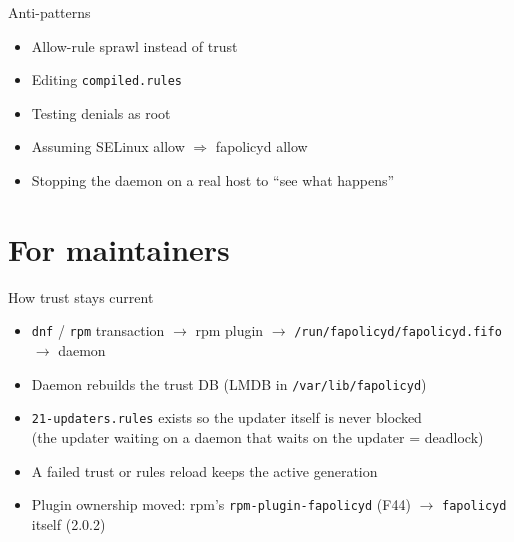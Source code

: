 \documentclass[aspectratio=169,11pt]{beamer}
\begin{document}
\begin{frame}{Anti-patterns}
  \begin{itemize}
    \item Allow-rule sprawl instead of trust
    \item Editing \texttt{compiled.rules}
    \item Testing denials as root
    \item Assuming SELinux allow $\Rightarrow$ fapolicyd allow
    \item Stopping the daemon on a real host to ``see what happens''
  \end{itemize}
\end{frame}

\section{For maintainers}

\begin{frame}{How trust stays current}
  \begin{itemize}
    \item \texttt{dnf} / \texttt{rpm} transaction $\rightarrow$ rpm plugin
          $\rightarrow$ \texttt{/run/fapolicyd/fapolicyd.fifo} $\rightarrow$ daemon
    \item Daemon rebuilds the trust DB (LMDB in \texttt{/var/lib/fapolicyd})
    \item \texttt{21-updaters.rules} exists so the updater itself is never blocked\\
          {\small (the updater waiting on a daemon that waits on the updater = deadlock)}
    \item A failed trust or rules reload keeps the active generation
    \item Plugin ownership moved: rpm's \texttt{rpm-plugin-fapolicyd} (F44)
          $\rightarrow$ \texttt{fapolicyd} itself (2.0.2)
  \end{itemize}
\end{frame}
\end{document}
